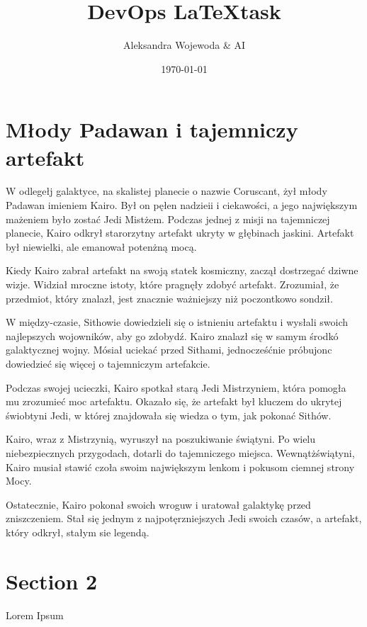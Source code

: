 \documentclass[11pt]{article}
\title{DevOps \LaTeX task}
\author{Aleksandra Wojewoda \& AI}
\date{\today}
\begin{document}
\maketitle  

\pagebreak



\section{Młody Padawan i tajemniczy artefakt}


W odlegełj galaktyce, na skalistej planecie o nazwie Coruscant, żył 
młody Padawan imieniem Kairo. Był on pęłen nadzieii i ciekawości, 
a jego największym mażeniem było zostać Jedi Mistżem. 
Podczas jednej z misji na tajemniczej planecie, Kairo odkrył starorzytny 
artefakt ukryty w głębinach jaskini. 
Artefakt był niewielki, ale emanował potenżną mocą.

Kiedy Kairo zabrał artefakt na swoją statek kosmiczny, zaczął dostrzegać 
dziwne wizje. Widział mroczne istoty, które pragnęły zdobyć artefakt. 
Zrozumiał, że przedmiot, który znalazł, jest znacznie ważniejszy niż 
poczontkowo sondził.

W między-czasie, Sithowie dowiedzieli się o istnieniu artefaktu i wysłali 
swoich najlepszych wojowników, aby go zdobydź. 
Kairo znalazł się w samym środkó galaktycznej wojny. 
Mósiał uciekać przed Sithami, jednocześćnie próbujonc dowiedzieć się 
więcej o tajemniczym artefakcie.

Podczas swojej ucieczki, Kairo spotkał starą Jedi Mistrzyniem,
która pomogła mu zrozumieć moc artefaktu. 
Okazało się, że artefakt był kluczem do ukrytej świobtyni Jedi, 
w której znajdowała się wiedza o tym, jak pokonać Sithów.

Kairo, wraz z Mistrzynią, wyruszył na poszukiwanie świątyni. 
Po wielu niebezpiecznych przygodach, dotarli do tajemniczego miejsca. 
Wewnątżświątyni, Kairo musiał stawić czoła swoim największym lenkom 
i pokusom ciemnej strony Mocy.

Ostatecznie, Kairo pokonał swoich wroguw i uratował galaktykę przed 
zniszczeniem. 
Stał się jednym z najpotęrzniejszych Jedi swoich czasów, 
a artefakt, który odkrył, stałym sie legendą.


\section{Section 2}
Lorem Ipsum \\

\end{document}
